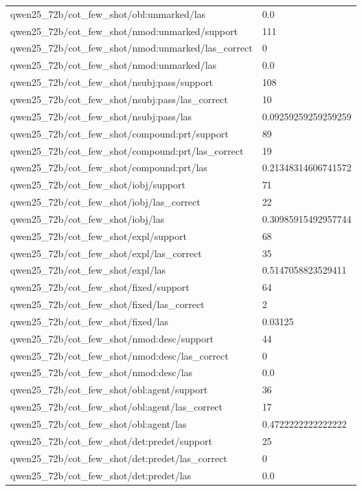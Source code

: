\begin{tabular}{ll}
qwen25\_72b/cot\_few\_shot/obl:unmarked/las & 0.0 \\
qwen25\_72b/cot\_few\_shot/nmod:unmarked/support & 111 \\
qwen25\_72b/cot\_few\_shot/nmod:unmarked/las\_correct & 0 \\
qwen25\_72b/cot\_few\_shot/nmod:unmarked/las & 0.0 \\
qwen25\_72b/cot\_few\_shot/nsubj:pass/support & 108 \\
qwen25\_72b/cot\_few\_shot/nsubj:pass/las\_correct & 10 \\
qwen25\_72b/cot\_few\_shot/nsubj:pass/las & 0.09259259259259259 \\
qwen25\_72b/cot\_few\_shot/compound:prt/support & 89 \\
qwen25\_72b/cot\_few\_shot/compound:prt/las\_correct & 19 \\
qwen25\_72b/cot\_few\_shot/compound:prt/las & 0.21348314606741572 \\
qwen25\_72b/cot\_few\_shot/iobj/support & 71 \\
qwen25\_72b/cot\_few\_shot/iobj/las\_correct & 22 \\
qwen25\_72b/cot\_few\_shot/iobj/las & 0.30985915492957744 \\
qwen25\_72b/cot\_few\_shot/expl/support & 68 \\
qwen25\_72b/cot\_few\_shot/expl/las\_correct & 35 \\
qwen25\_72b/cot\_few\_shot/expl/las & 0.5147058823529411 \\
qwen25\_72b/cot\_few\_shot/fixed/support & 64 \\
qwen25\_72b/cot\_few\_shot/fixed/las\_correct & 2 \\
qwen25\_72b/cot\_few\_shot/fixed/las & 0.03125 \\
qwen25\_72b/cot\_few\_shot/nmod:desc/support & 44 \\
qwen25\_72b/cot\_few\_shot/nmod:desc/las\_correct & 0 \\
qwen25\_72b/cot\_few\_shot/nmod:desc/las & 0.0 \\
qwen25\_72b/cot\_few\_shot/obl:agent/support & 36 \\
qwen25\_72b/cot\_few\_shot/obl:agent/las\_correct & 17 \\
qwen25\_72b/cot\_few\_shot/obl:agent/las & 0.4722222222222222 \\
qwen25\_72b/cot\_few\_shot/det:predet/support & 25 \\
qwen25\_72b/cot\_few\_shot/det:predet/las\_correct & 0 \\
qwen25\_72b/cot\_few\_shot/det:predet/las & 0.0 \\

\end{tabular}
